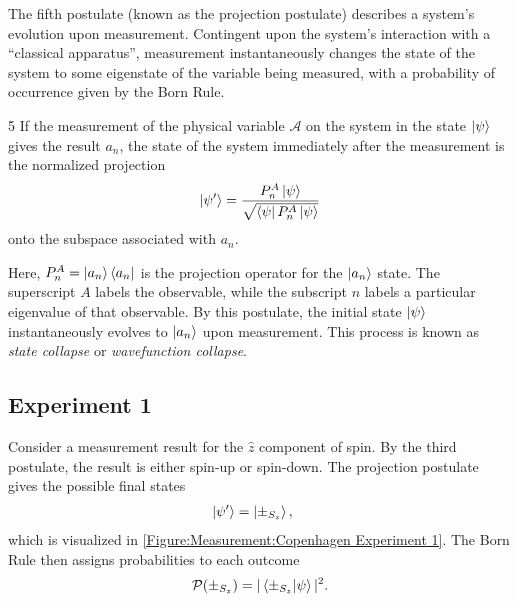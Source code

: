 The fifth postulate (known as the projection postulate) describes a system's evolution upon measurement. Contingent upon the system's interaction with a ``classical apparatus'', measurement instantaneously changes the state of the system to some eigenstate of the variable being measured, with a probability of occurrence given by the Born Rule.

\begin{Thm:Postulate}{5} \label{projection postulate}
    If the measurement of the physical variable $\mathcal{A}$ on the system in the state $\ket{\psi}$ gives the result $a_n$, the state of the system immediately after the measurement is the normalized projection
    \begin{align}
        \ket{\psi^\prime} = \frac{P^A_n\ket{\psi}}{\sqrt{\bra{\psi}P^A_n\ket{\psi}
        }}
    \end{align}
    onto the subspace associated with $a_n$.
\end{Thm:Postulate}
Here, $P^A_n = \ket{a_n}\bra{a_n}$ is the projection operator for the $\ket{a_n}$ state. The superscript $A$ labels the observable, while the subscript $n$ labels a particular eigenvalue of that observable. By this postulate, the initial state $\ket{\psi}$ instantaneously evolves to $\ket{a_n}$ upon measurement. This process is known as \textit{state collapse} or \textit{wavefunction collapse}.

\subsection{Experiment 1}\label{Standard Experiment 1}
Consider a measurement result for the $\hat{z}$ component of spin. By the third postulate, the result is either spin-up or spin-down. The projection postulate gives the possible final states
\begin{align}
  \ket{\psi'} &= \ket{\pm_{S_z}},
\end{align}
which is visualized in \autoref{Figure:Measurement:Copenhagen Experiment 1}. The Born Rule then assigns probabilities to each outcome
\begin{align}
  \mathcal{P}(\pm_{S_z}) = |\braket{\pm_{S_z} | \psi}|^2 .
\end{align}


